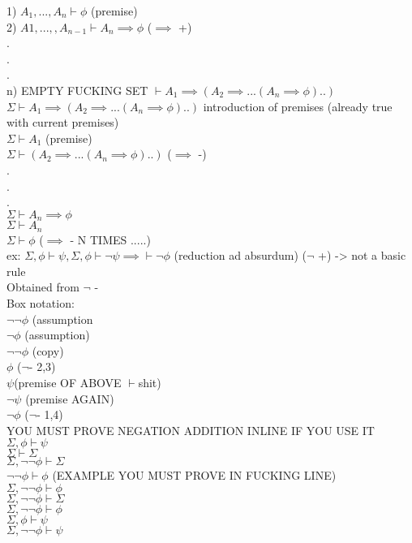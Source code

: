 \documentclass[12pt,oneside,fleqn]{article}
\theoremstyle{definition}
\begin{document}
1) $A_1,...,A_n \vdash \phi$ (premise) \\
2) $A1,...,,A_{n-1} \vdash A_n \implies \phi$ ($\implies$ +) \\
. \\
. \\
. \\
n) EMPTY FUCKING SET $\vdash A_1 \implies (A_2 \implies ...(A_n \implies \phi ) ..)$ \\
$\Sigma \vdash A_1 \implies (A_2 \implies ...(A_n \implies \phi) ..)$ introduction of premises (already true with current premises) \\
$\Sigma \vdash A_1$ (premise) \\
$\Sigma \vdash (A_2 \implies ...(A_n \implies \phi) ..)$ ($\implies$ -) \\
. \\
. \\
. \\
$\Sigma \vdash A_n \implies \phi$ \\
$\Sigma \vdash A_n$ \\
$\Sigma \vdash \phi$ ($\implies$ - N TIMES .....) \\

ex: $\Sigma, \phi \vdash \psi, \Sigma, \phi \vdash \neg \psi \implies \vdash \neg \phi$ (reduction ad absurdum) ($\neg$ +) -> not a basic rule \\
Obtained from $\neg$ - \\
Box notation: \\
 $\neg \neg \phi$ (assumption \\
    $\neg \phi$ (assumption) \\
    $\neg \neg \phi$ (copy) \\
$ \phi$ ($\neg $- 2,3) \\
 $\psi $(premise OF ABOVE $\vdash $shit) \\
 $\neg \psi$ (premise AGAIN) \\
$\neg \phi$ ($\neg $- 1,4) \\

YOU MUST PROVE NEGATION ADDITION INLINE IF YOU USE IT \\

$\Sigma, \phi \vdash \psi$ \\
$\Sigma \vdash \Sigma$ \\
$\Sigma, \neg \neg \phi \vdash \Sigma$ \\
$\neg \neg \phi \vdash \phi$ (EXAMPLE YOU MUST PROVE IN FUCKING LINE) \\
$\Sigma, \neg \neg \phi \vdash \phi$ \\
$\Sigma, \neg \neg \phi \vdash \Sigma  $ \\
$\Sigma, \neg \neg \phi \vdash \phi$ \\
$\Sigma, \phi \vdash \psi$ \\
$\Sigma, \neg \neg \phi \vdash \psi$ \\
\end{document}
